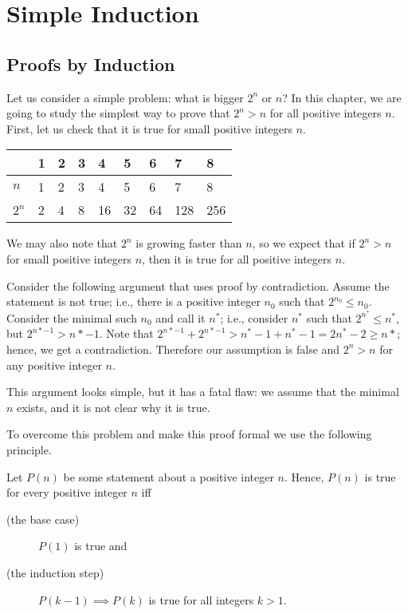 \chapter{Simple Induction}
\label{chapter:simple-induction}
\section{Proofs by Induction}

Let us consider a simple problem: what is bigger $2^n$ or $n$? In this chapter,
we are going to study the simplest way to prove that $2^n > n$ for all positive
integers $n$. First, let us check that it is true for small positive integers
$n$.
\begin{center}
  \begin{tabular}{l l l  l  l  l  l  l  l}
    \toprule
          & 1 & 2 & 3 & 4  & 5  & 6  & 7   & 8   \\
    \midrule
    $n$   & 1 & 2 & 3 & 4  & 5  & 6  & 7   & 8   \\
    $2^n$ & 2 & 4 & 8 & 16 & 32 & 64 & 128 & 256 \\
    \bottomrule
  \end{tabular}
\end{center}
We may also note that $2^n$ is growing faster than $n$, so we expect that if
$2^n > n$ for small positive integers $n$, then it is true for all positive
integers $n$.

Consider the following argument that uses proof by contradiction. Assume the
statement is not true; i.e., there is a positive integer $n_0$ such that 
$2^{n_0} \le n_0$. Consider the minimal such $n_0$ and call it $n^*$; i.e.,
consider $n^*$ such that $2^{n^*} \le n^*$, but $2^{n* - 1} > n* - 1$.
Note that $2^{n* - 1} + 2^{n* - 1} > n^* - 1 + n^* - 1 = 2n^* - 2 \ge n*$;
hence, we get a contradiction. Therefore our assumption is false and $2^n > n$
for any positive integer $n$.

This argument looks simple, but it has a fatal flaw: we assume that the minimal
$n$ exists, and it is not clear why it is true.

To overcome this problem and make this proof formal we use the following
principle.
\begin{principle}
  Let $P(n)$ be some statement about a positive integer $n$.
  Hence, $P(n)$ is true for every positive integer $n$ iff
  \begin{description}
    \item [(the base case)] $P(1)$ is true and
    \item [(the induction step)] $P(k - 1) \implies P(k)$ is true
      for all integers $k > 1$.
  \end{description}
\end{principle}


